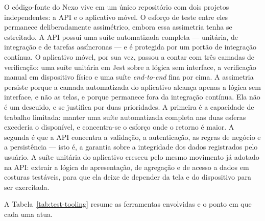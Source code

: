 O código-fonte do Nexo vive em um único repositório com dois projetos
independentes: a API e o aplicativo móvel. O esforço de teste entre eles
permanece deliberadamente assimétrico, embora essa assimetria tenha se
estreitado. A API possui uma suíte automatizada completa --- unitária, de
integração e de tarefas assíncronas --- e é protegida por um portão de
integração contínua. O aplicativo móvel, por sua vez, passou a contar com três
camadas de verificação: uma suíte unitária em Jest sobre a lógica sem
interface, a verificação manual em dispositivo físico e uma suíte
\textit{end-to-end} fina por cima. A assimetria persiste porque a camada
automatizada do aplicativo alcança apenas a lógica sem interface, e não as
telas, e porque permanece fora da integração contínua. Ela não é um descuido, e
se justifica por duas prioridades. A primeira é a capacidade de trabalho
limitada: manter uma suíte automatizada completa nas duas esferas excederia o
disponível, e concentra-se o esforço onde o retorno é maior. A segunda é que a
API concentra a validação, a autenticação, as regras de negócio e a persistência
--- isto é, a garantia sobre a integridade dos dados registrados pelo usuário. A
suíte unitária do aplicativo cresceu pelo mesmo movimento já adotado na API:
extrair a lógica de apresentação, de agregação e de acesso a dados em costuras
testáveis, para que ela deixe de depender da tela e do dispositivo para ser
exercitada.

A Tabela~\ref{tab:test-tooling} resume as ferramentas envolvidas e o ponto em que
cada uma atua.

